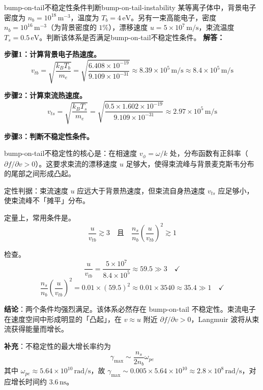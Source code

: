 \begin{example}{bump-on-tail不稳定性条件判断}{bump-on-tail-instability}
某等离子体中，背景电子密度为 $n_b = 10^{18}\,\mathrm{m}^{-3}$，温度为 $T_b = 4\,\mathrm{eV}$。另有一束高能电子，密度 $n_b = 10^{16}\,\mathrm{m}^{-3}$（为背景密度的 $1\%$），漂移速度 $u = 5\times 10^{7}\,\mathrm{m/s}$，束流温度 $T_s = 0.5\,\mathrm{eV}$。判断该体系是否满足bump-on-tail不稳定性条件。
\tcblower
\textbf{解答：}

\textbf{步骤1：计算背景电子热速度。}
\[
v_{tb} = \sqrt{\frac{k_{\!B}T_b}{m_e}}
= \sqrt{\frac{6.408\times 10^{-19}}{9.109\times 10^{-31}}}
\approx 8.39\times 10^{5}\,\mathrm{m/s} \approx 8.4\times 10^{5}\,\mathrm{m/s}
\]

\textbf{步骤2：计算束流热速度。}
\[
v_{ts} = \sqrt{\frac{k_{\!B}T_s}{m_e}}
= \sqrt{\frac{0.5\times 1.602\times 10^{-19}}{9.109\times 10^{-31}}}
\approx 2.97\times 10^{5}\,\mathrm{m/s}
\]

\textbf{步骤3：判断不稳定性条件。}

bump-on-tail不稳定性的核心是：在相速度 $v_\phi = \omega/k$ 处，分布函数有正斜率（$\partial f/\partial v > 0$）。这要求束流的漂移速度 $u$ 足够大，使得束流峰与背景麦克斯韦分布的尾部之间形成凸起。

定性判据：束流速度 $u$ 应远大于背景热速度，但束流自身热速度 $v_{ts}$ 应足够小，使束流峰不「摊平」分布。

定量上，常用条件是。
\[
\frac{u}{v_{tb}} \gtrsim 3\quad\text{且}\quad
\frac{n_s}{n_b}\left(\frac{u}{v_{tb}}\right)^2 \gtrsim 1
\]

检查。
\[
\frac{u}{v_{tb}} = \frac{5\times 10^{7}}{8.4\times 10^{5}} \approx 59.5 \gg 3 \quad\checkmark
\]
\[
\frac{n_s}{n_b}\left(\frac{u}{v_{tb}}\right)^2
= 0.01\times (59.5)^2 \approx 0.01\times 3540 \approx 35.4 \gg 1 \quad\checkmark
\]

\textbf{结论}：两个条件均强烈满足。该体系必然存在 bump-on-tail 不稳定性。束流电子在速度空间中形成明显的「凸起」，在 $v \approx u$ 附近 $\partial f/\partial v > 0$，Langmuir 波将从束流获得能量而增长。

\textbf{补充}：不稳定性的最大增长率约为
\[
\gamma_{\max} \sim \frac{n_s}{2n_b}\omega_{pe}
\]
其中 $\omega_{pe} \approx 5.64\times 10^{10}\,\mathrm{rad/s}$，故 $\gamma_{\max} \sim 0.005\times 5.64\times 10^{10} \approx 2.8\times 10^{8}\,\mathrm{rad/s}$，对应增长时间约 $3.6\,\mathrm{ns}$。
\end{example}

